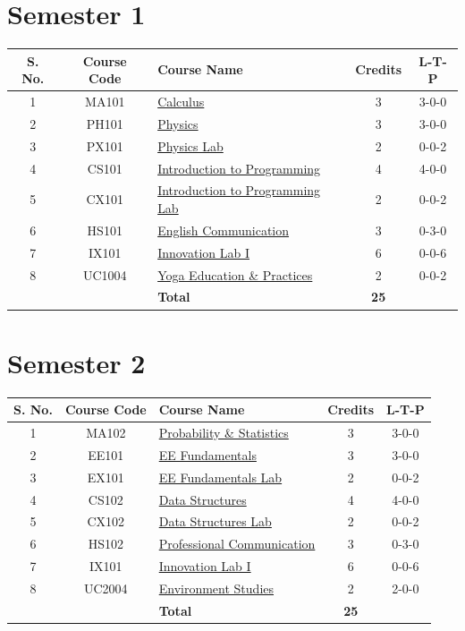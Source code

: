 \section*{Semester 1}

\begin{longtable}{|c|c|p{7cm}|c|c|}
\hline
\textbf{S. No.} & \textbf{Course Code} & \textbf{Course Name} & \textbf{Credits} & \textbf{L-T-P} \\
\hline
1 & MA101 & \hyperref[course:MA101]{Calculus} & 3 & 3-0-0 \\
\hline
2 & PH101 & \hyperref[course:PH101]{Physics} & 3 & 3-0-0 \\
\hline
3 & PX101 & \hyperref[course:PX101]{Physics Lab} & 2 & 0-0-2 \\
\hline
4 & CS101 & \hyperref[course:CS101]{Introduction to Programming} & 4 & 4-0-0 \\
\hline
5 & CX101 & \hyperref[course:CX101]{Introduction to Programming Lab} & 2 & 0-0-2 \\
\hline
6 & HS101 & \hyperref[course:HS101]{English Communication} & 3 & 0-3-0 \\
\hline
7 & IX101 & \hyperref[course:IX101]{Innovation Lab I} & 6 & 0-0-6 \\
\hline
8 & UC1004 & \hyperref[course:UC1004]{Yoga Education \& Practices} & 2 & 0-0-2 \\
\hline
& & \textbf{Total} & \textbf{25} & \\
\hline
\end{longtable}

\section*{Semester 2}

\begin{longtable}{|c|c|p{7cm}|c|c|}
\hline
\textbf{S. No.} & \textbf{Course Code} & \textbf{Course Name} & \textbf{Credits} & \textbf{L-T-P} \\
\hline
1 & MA102 & \hyperref[course:MA102]{Probability \& Statistics} & 3 & 3-0-0 \\
\hline
2 & EE101 & \hyperref[course:EE101]{EE Fundamentals} & 3 & 3-0-0 \\
\hline
3 & EX101 & \hyperref[course:EX101]{EE Fundamentals Lab} & 2 & 0-0-2 \\
\hline
4 & CS102 & \hyperref[course:CS102]{Data Structures} & 4 & 4-0-0 \\
\hline
5 & CX102 & \hyperref[course:CX102]{Data Structures Lab} & 2 & 0-0-2 \\
\hline
6 & HS102 & \hyperref[course:HS102]{Professional Communication} & 3 & 0-3-0 \\
\hline
7 & IX101 & \hyperref[course:IX101]{Innovation Lab I} & 6 & 0-0-6 \\
\hline
8 & UC2004 & \hyperref[course:UC2004]{Environment Studies} & 2 & 2-0-0 \\
\hline
& & \textbf{Total} & \textbf{25} & \\
\hline
\end{longtable}

